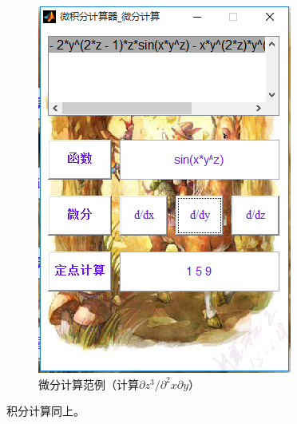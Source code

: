 \documentclass[UTF8]{ctexart}
\begin{document}
\begin{figure}[H]
\centering
\includegraphics[scale=0.4]{image/pic09.png}
\caption{微分计算范例（计算$ \partial z^3 /\partial^2 x \partial y$）}
\label{fig:pic09}
\end{figure}
积分计算同上。
\end{document}
